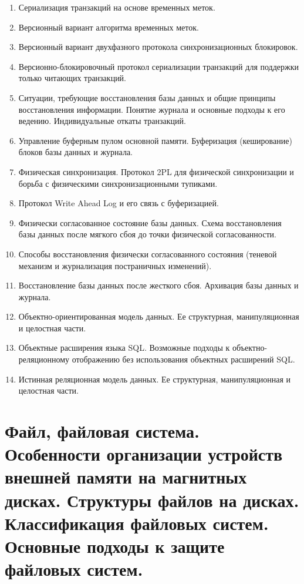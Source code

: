 \documentclass[a4paper,12pt]{article}
\begin{document}
\begin{titlepage}
\begin{multicols}{3}
\begin{enumerate}[label=\arabic*.]
            \item Сериализация транзакций на основе временных меток.
            \item Версионный вариант алгоритма временных меток.
            \item Версионный вариант двухфазного протокола синхронизационных блокировок.
            \item Версионно-блокировочный протокол сериализации транзакций для поддержки только читающих транзакций.
            \item Ситуации, требующие восстановления базы данных и общие принципы восстановления информации. Понятие журнала и основные подходы к его ведению. Индивидуальные откаты транзакций.
            \item Управление буферным пулом основной памяти. Буферизация (кеширование) блоков базы данных и журнала.
            \item Физическая синхронизация. Протокол 2PL для физической синхронизации и борьба с физическими синхронизационными тупиками.
            \item Протокол Write Ahead Log и его связь с буферизацией.
            \item Физически согласованное состояние базы данных. Схема восстановления базы данных после мягкого сбоя до точки физической согласованности.
            \item Способы восстановления физически согласованного состояния (теневой механизм и журнализация постраничных изменений).
            \item Восстановление базы данных после жесткого сбоя. Архивация базы данных и журнала.
            \item Объектно-ориентированная модель данных. Ее структурная, манипуляционная и целостная части.
            \item Объектные расширения языка SQL. Возможные подходы к объектно-реляционному отображению без использования объектных расширений SQL.
            \item Истинная реляционная модель данных. Ее структурная, манипуляционная и целостная части.
        \end{enumerate}
    \end{multicols}
    
\end{titlepage}

\section{Файл, файловая система. Особенности организации устройств внешней памяти на магнитных дисках. Структуры файлов на дисках. Классификация файловых систем. Основные подходы к защите файловых систем.}
\end{document}

